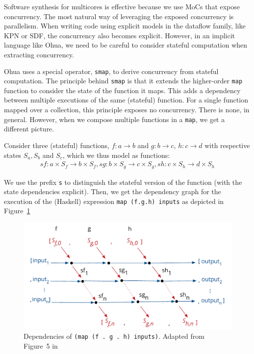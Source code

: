 Software synthesis for multicores is effective because we use \acp{MoC} that expose concurrency.
The most natural way of leveraging the exposed concurrency is parallelism. 
When writing code using explicit models in the dataflow family, like \ac{KPN} or \ac{SDF}, the concurrency also becomes explicit.
However, in an implicit language like Ohua, we need to be careful to consider stateful computation when extracting concurrency.

Ohua uses a special operator, \texttt{smap}, to derive concurrency from stateful computation.
The principle behind \texttt{smap} is that it extends the higher-order \texttt{map} function to consider the state of the function it maps.
This adds a dependency between multiple executions of the same (stateful) function.
For a single function mapped over a collection, this principle exposes no concurrency. There is none, in general.
However, when we compose multiple functions in a \texttt{map}, we get a different picture.

Consider three (stateful) functions, $f: a \rightarrow b$ and $g : b \rightarrow c$, $h : c \rightarrow d$ with respective states $S_a, S_b$ and $S_c$, which we thus model as functions: 
\begin{align*}
sf : a \times S_f \rightarrow b \times S_f, sg : b \times S_g \rightarrow c \times S_g, sh : c \times S_h \rightarrow d \times S_h
\end{align*}

We use the prefix \texttt{s} to distinguish the stateful version of the function (with the state dependencies explicit).
Then, we get the dependency graph for the execution of the (Haskell) expression \texttt{map (f.g.h) inputs} as depicted in Figure~\ref{fig:smap_state}

\begin{figure}[h]
	\centering
	\includegraphics[scale=0.5]{figures/smap_state.pdf}
	\caption{ Dependencies of \texttt{(map (f . g . h) inputs)}. Adapted from Figure~5 in~\cite{ertel_haskell19}}
	\label{fig:smap_state}
\end{figure}

